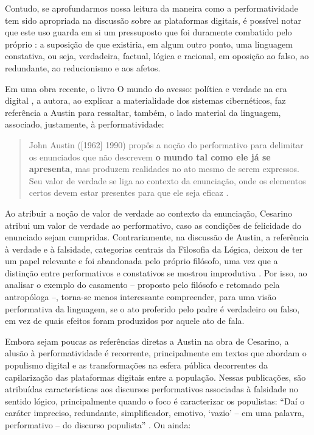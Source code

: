 \documentclass[portuguese]{textolivre}
\begin{document}
Contudo, se aprofundarmos nossa leitura da maneira como a performatividade tem sido apropriada na discussão sobre as plataformas digitais, é possível notar que este uso guarda em si um pressuposto que foi duramente combatido pelo próprio \textcite{austin1962how,austin1998performativo}: a suposição de que existiria, em algum outro ponto, uma linguagem constativa, ou seja, verdadeira, factual, lógica e racional, em oposição ao falso, ao redundante, ao reducionismo e aos afetos.

Em uma obra recente, o livro O mundo do avesso: política e verdade na era digital \cite{cesarino2022b}, a autora, ao explicar a materialidade dos sistemas cibernéticos, faz referência a Austin para ressaltar, também, o lado material da linguagem, associado, justamente, à performatividade:

\begin{quote}
    John Austin ([1962] 1990) propôs a noção do performativo para delimitar os enunciados que não descrevem \textbf{o mundo tal como ele já se apresenta}, mas produzem realidades no ato mesmo de serem expressos. Seu valor de verdade se liga ao contexto da enunciação, onde os elementos certos devem estar presentes para que ele seja eficaz \cite[p. 32, grifos nossos]{cesarino2022b}.
\end{quote}

Ao atribuir a noção de valor de verdade ao contexto da enunciação, Cesarino atribui um valor de verdade ao performativo, caso as condições de felicidade do enunciado sejam cumpridas. Contrariamente, na discussão de Austin, a referência à verdade e à falsidade, categorias centrais da Filosofia da Lógica, deixou de ter um papel relevante e foi abandonada pelo próprio filósofo, uma vez que a distinção entre performativos e constativos se mostrou improdutiva \cite{austin1998performativo}. Por isso, ao analisar o exemplo do casamento – proposto pelo filósofo e retomado pela antropóloga –, torna-se menos interessante compreender, para uma visão performativa da linguagem, se o ato proferido pelo padre é verdadeiro ou falso, em vez de quais efeitos foram produzidos por aquele ato de fala.

Embora sejam poucas as referências diretas a Austin na obra de Cesarino, a alusão à performatividade é recorrente, principalmente em textos que abordam o populismo digital e as transformações na esfera pública decorrentes da capilarização das plataformas digitais entre a população. Nessas publicações, são atribuídas características aos discursos performativos associadas à falsidade no sentido lógico, principalmente quando o foco é caracterizar os populistas: “Daí o caráter impreciso, redundante, simplificador, emotivo, ‘vazio’ – em uma palavra, performativo – do discurso populista” \cite[p. 99]{cesarino2020populismo}. Ou ainda:
\end{document}
